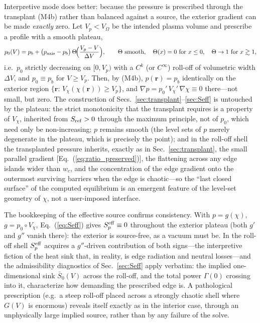 \documentclass[english]{article}
\newcommand{\br}{\mathbf{r}}
\begin{document}
Interpretive mode does better: because the pressure is prescribed through the transplant (M4b)
rather than balanced against a source, the exterior gradient can be made \emph{exactly} zero. Let
$V_p<V_\Omega$ be the intended plasma volume and prescribe a profile with a smooth plateau,
\begin{equation}
p_0(V)=p_b+\big(p_{\rm axis}-p_b\big)\,\Theta\!\Big(\frac{V_p-V}{\Delta V}\Big),
\qquad
\Theta\ \text{smooth},\quad \Theta(x)=0\ \text{for}\ x\le0,\quad
\Theta\rightarrow1\ \text{for}\ x\gtrsim1 ,
\label{eq:p0_plateau}
\end{equation}
i.e.\ $p_0$ strictly decreasing on $[0,V_p)$ with a $C^{k}$ (or $C^\infty$) roll-off of volumetric
width $\Delta V$, and $p_0\equiv p_b$ for $V\ge V_p$. Then, by (M4b),
$p(\br)=p_b$ identically on the exterior region $\{\br:\,V_\chi(\chi(\br))\ge V_p\}$, and
$\nabla p=p_0'\,V_\chi'\,\nabla\chi\equiv0$ there---not small, but zero. The construction of
Secs.~\ref{sec:transplant}--\ref{sec:Seff} is untouched by the plateau: the strict monotonicity
that the transplant requires is a property of $V_\chi$, inherited from $S_{\rm ref}>0$ through
the maximum principle, not of $p_0$, which need only be non-increasing; $p$ remains smooth (the
level sets of $p$ merely degenerate in the plateau, which is precisely the point); and in the
roll-off shell the transplanted pressure inherits, exactly as in
Sec.~\ref{sec:transplant}, the small parallel gradient
[Eq.~(\ref{eq:ratio_preserved})], the flattening across any edge islands wider than $w_c$, and the
concentration of the edge gradient onto the outermost surviving barriers when the edge is
chaotic---so the ``last closed surface'' of the computed equilibrium is an emergent feature of the
level-set geometry of $\chi$, not a user-imposed interface.

The bookkeeping of the effective source confirms consistency. With $p=g(\chi)$,
$g=p_0\circ V_\chi$, Eq.~(\ref{eq:Seff}) gives $S_p^{\rm eff}\equiv0$ throughout the exterior
plateau (both $g'$ and $g''$ vanish there): the exterior is source-free, as a vacuum must be. In
the roll-off shell $S_p^{\rm eff}$ acquires a $g''$-driven contribution of both signs---the
interpretive fiction of the heat sink that, in reality, is edge radiation and neutral
losses---and the admissibility diagnostics of Sec.~\ref{sec:Seff} apply verbatim: the implied
one-dimensional sink $\bar S_0(V)$ across the roll-off, and the total power
$\Gamma(0)$ crossing into it, characterize how demanding the prescribed edge is. A pathological
prescription (e.g.\ a steep roll-off placed across a strongly chaotic shell where $G(V)$ is
enormous) reveals itself exactly as in the interior case, through an unphysically large implied
source, rather than by any failure of the solve.
\end{document}
